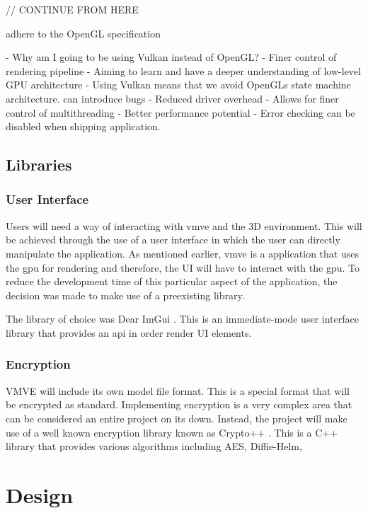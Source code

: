 \documentclass[11pt]{article}
\begin{document}
// CONTINUE FROM HERE

adhere to the OpenGL specification

- Why am I going to be using Vulkan instead of OpenGL?
-   Finer control of rendering pipeline
-   Aiming to learn and have a deeper understanding of low-level GPU architecture
-   Using Vulkan means that we avoid OpenGLs state machine architecture.
    can introduce bugs
-   Reduced driver overhead
-   Allows for finer control of multithreading
-   Better performance potential
-   Error checking can be disabled when shipping application.



\subsection{Libraries}

\subsubsection{User Interface}
Users will need a way of interacting with \gls{vmve} and the 3D environment.
This will be achieved through the use of a user interface in which the user can
directly manipulate the application. As mentioned earlier, \gls{vmve} is a
application that uses the \gls{gpu} for rendering and therefore, the UI will
have to interact with the \gls{gpu}. To reduce the development time of this
particular aspect of the application, the decision was made to make use of a
preexisting library.

The library of choice was Dear ImGui \cite{imgui}. This is an immediate-mode
user interface library that provides an \gls{api} in order render UI elements. 

\subsubsection{Encryption} \label{custom_file_format} VMVE will include its own
model file format. This is a special format that will be encrypted as standard.
Implementing encryption is a very complex area that can be considered an entire
project on its down. Instead, the project will make use of a well known
encryption library known as Crypto++ \cite{cryptopp}. This is a C++ library that
provides various algorithms including AES, Diffie-Helm, 

\section{Design}
\end{document}
